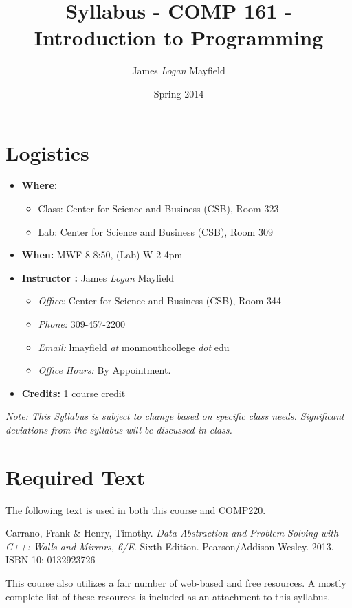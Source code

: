 \documentclass[10pt]{article}
\title{Syllabus - COMP 161 - Introduction to Programming}
\author{ James \textit{Logan} Mayfield }
\date{Spring 2014}
\begin{document}
\maketitle

\section{Logistics}
\begin{itemize}
\item \textbf{Where: } 
\begin{itemize} 
\item Class: Center for Science and Business (CSB), Room 323	
\item Lab: Center for Science and Business (CSB), Room 309
\end{itemize}
\item \textbf{When: } MWF 8-8:50, (Lab) W 2-4pm
\item \textbf{Instructor :} James \textit{Logan} Mayfield
\begin{itemize}
\item \textit{Office: } Center for Science and Business (CSB), Room 344
\item \textit{Phone: } 309-457-2200
\item \textit{Email: } lmayfield \textit{at} monmouthcollege \textit{dot} edu
\item \textit{Office Hours: }  By Appointment.
\end{itemize}
\item \textbf{Credits: } 1 course credit
\end{itemize}
\emph{Note: This Syllabus is subject to change based on specific class needs. Significant deviations from the syllabus will be discussed in class.}

\section{Required Text}

The following text is used in both this course and COMP220.  
\vspace{.2in}

Carrano, Frank \& Henry, Timothy. \emph{Data Abstraction and Problem Solving with C++: Walls and Mirrors, 6/E}. Sixth Edition. Pearson/Addison Wesley. 2013. ISBN-10: 0132923726

\vspace{.2in}
This course also utilizes a fair number of web-based and free resources.  A mostly complete list of these resources is included as an attachment to this syllabus.
\end{document}
